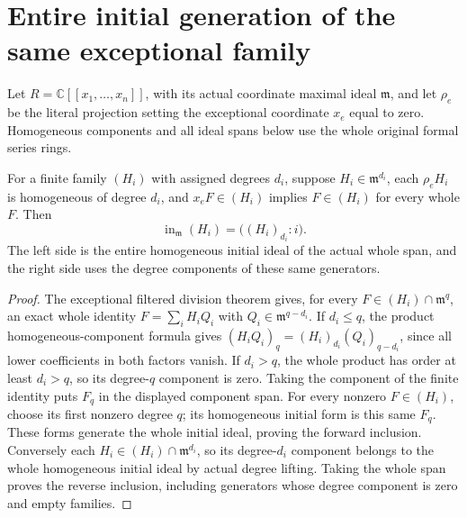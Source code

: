 \section{Entire initial generation of the same exceptional family}

Let $R=\mathbb C[[x_1,\ldots,x_n]]$, with its actual coordinate maximal
ideal $\mathfrak m$, and let $\rho_e$ be the literal projection setting the
exceptional coordinate $x_e$ equal to zero. Homogeneous components and all
ideal spans below use the whole original formal series rings.

\begin{theorem}
\label{hir:actual-exceptional-family-entire-initial-generation}
\leanok
For a finite family $(H_i)$ with assigned degrees $d_i$, suppose
$H_i\in\mathfrak m^{d_i}$, each $\rho_e H_i$ is homogeneous of degree
$d_i$, and $x_eF\in(H_i)$ implies $F\in(H_i)$ for every whole $F$.
Then
\[
 \operatorname{in}_{\mathfrak m}(H_i)
   =\bigl((H_i)_{d_i}:i\bigr).
\]
The left side is the entire homogeneous initial ideal of the actual whole
span, and the right side uses the degree components of these same generators.
\end{theorem}
\begin{proof}
The exceptional filtered division theorem gives, for every
$F\in(H_i)\cap\mathfrak m^q$, an exact whole identity
$F=\sum_iH_iQ_i$ with $Q_i\in\mathfrak m^{q-d_i}$. If $d_i\le q$,
the product homogeneous-component formula gives
$(H_iQ_i)_q=(H_i)_{d_i}(Q_i)_{q-d_i}$, since all lower coefficients in
both factors vanish. If $d_i>q$, the whole product has order at least
$d_i>q$, so its degree-$q$ component is zero. Taking the component of the
finite identity puts $F_q$ in the displayed component span. For every
nonzero $F\in(H_i)$, choose its first nonzero degree $q$; its homogeneous
initial form is this same $F_q$. These forms generate the whole initial
ideal, proving the forward inclusion. Conversely each
$H_i\in(H_i)\cap\mathfrak m^{d_i}$, so its degree-$d_i$ component
belongs to the whole homogeneous initial ideal by actual degree lifting.
Taking the whole span proves the reverse inclusion, including generators
whose degree component is zero and empty families.
\end{proof}


